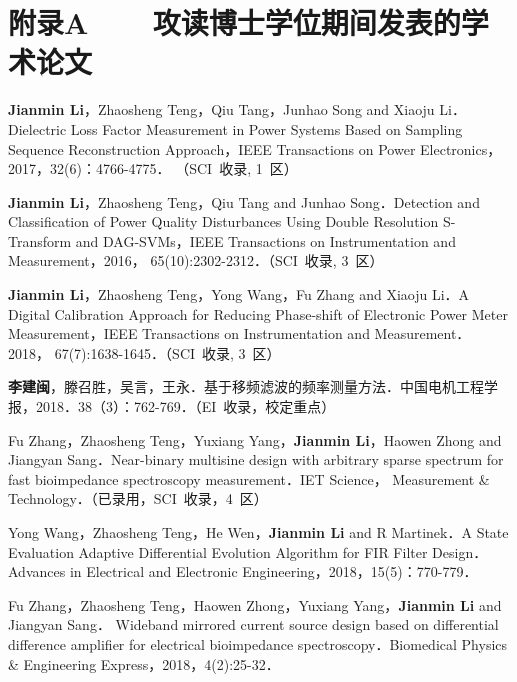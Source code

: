 

\chapter*{附录A~~~~攻读博士学位期间发表的学术论文}
\setlength{\parindent}{0em}
\begin{publist}
	\item \textbf{Jianmin Li}，Zhaosheng Teng，Qiu Tang，Junhao Song and Xiaoju Li．Dielectric Loss Factor Measurement in Power Systems Based on Sampling Sequence Reconstruction Approach，IEEE Transactions on Power Electronics，2017，32(6)：4766-4775． （SCI~收录, 1~区）
	\item \textbf{Jianmin Li}，Zhaosheng Teng，Qiu Tang and Junhao Song．Detection and Classification of Power Quality Disturbances Using Double Resolution S-Transform and DAG-SVMs，IEEE Transactions on Instrumentation and Measurement，2016， 65(10):2302-2312．（SCI~收录, 3~区）
	\item \textbf{Jianmin Li}，Zhaosheng Teng，Yong Wang，Fu Zhang and Xiaoju Li．A Digital Calibration Approach for Reducing Phase-shift of Electronic Power Meter Measurement，IEEE Transactions on Instrumentation and Measurement．2018， 67(7):1638-1645．（SCI~收录, 3~区）
	\item \textbf{李建闽}，滕召胜，吴言，王永．基于移频滤波的频率测量方法．中国电机工程学报，2018．38（3）：762-769．（EI~收录，校定重点）
	\item Fu Zhang，Zhaosheng Teng，Yuxiang Yang，\textbf{Jianmin Li}，Haowen Zhong and Jiangyan Sang．Near-binary multisine design with arbitrary sparse spectrum for fast bioimpedance spectroscopy measurement．IET Science， Measurement \& Technology．（已录用，SCI~收录，4~区）
	\item Yong Wang，Zhaosheng Teng，He Wen，\textbf{Jianmin Li} and R Martinek．A State Evaluation Adaptive Differential Evolution Algorithm for FIR Filter Design．Advances in Electrical and Electronic Engineering，2018，15(5)：770-779．
	\item Fu Zhang，Zhaosheng Teng，Haowen Zhong，Yuxiang Yang，\textbf{Jianmin Li} and Jiangyan Sang． Wideband mirrored current source design based on differential difference amplifier for electrical bioimpedance spectroscopy．Biomedical Physics \& Engineering Express，2018，4(2):25-32．

\end{publist}
